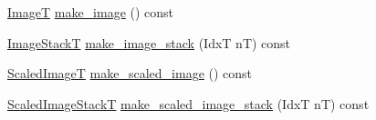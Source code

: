 \begin{DoxyCompactItemize}
\item 
\hyperlink{classboxxer_1_1Boxxer2D_ad1c52f05a957159bf373b4d8c4361ffe}{ImageT} \hyperlink{classboxxer_1_1Boxxer2D_a3a3deae8a4d6105bcf5793151278f9b7}{make\+\_\+image} () const 
\item 
\hyperlink{classboxxer_1_1Boxxer2D_a35da86be183f5f24cb3d13cbf7cf45ee}{Image\+StackT} \hyperlink{classboxxer_1_1Boxxer2D_aa481bbbab9b8aff1f470a5c82fb71f9b}{make\+\_\+image\+\_\+stack} (IdxT nT) const 
\item 
\hyperlink{classboxxer_1_1Boxxer2D_ad8d3ac7a59998612e4ce00500416c8c1}{Scaled\+ImageT} \hyperlink{classboxxer_1_1Boxxer2D_a4817f3e6707a0ca9330ae6f0dbfb89da}{make\+\_\+scaled\+\_\+image} () const 
\item 
\hyperlink{classboxxer_1_1Boxxer2D_a2937a772edcf9cec5f617fbcf1d8a6fe}{Scaled\+Image\+StackT} \hyperlink{classboxxer_1_1Boxxer2D_a5c2ee267ed5ac1c61d3b7a9c935e0922}{make\+\_\+scaled\+\_\+image\+\_\+stack} (IdxT nT) const 
\end{DoxyCompactItemize}
